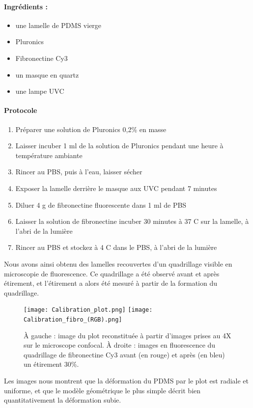 	\paragraph{Ingrédients : }
	\begin{itemize}
	\item une lamelle de PDMS vierge
	\item Pluronics
	\item Fibronectine Cy3
	\item un masque en quartz 
	\item une lampe UVC
	\end{itemize}
	
	\paragraph{Protocole}
	\begin{enumerate}
	\item Préparer une solution de Pluronics 0,2\% en masse
	\item Laisser incuber 1 ml de la solution de Pluronics pendant une heure à température ambiante
	\item Rincer au PBS, puis à l'eau, laisser sécher
	\item Exposer la lamelle derrière le masque aux UVC pendant 7 minutes
	\item Diluer 4 \micro g de fibronectine fluorescente dans 1 ml de PBS
	\item Laisser la solution de fibronectine incuber 30 minutes à 37 \degres C sur la lamelle, à l'abri de la lumière
	\item Rincer au PBS et stockez à 4 \degres C dans le PBS, à l'abri de la lumière
\end{enumerate}		
	
	Nous avons ainsi obtenu des lamelles recouvertes d'un quadrillage visible en microscopie de fluorescence. Ce quadrillage a été observé avant et après étirement, et l'étirement a alors été mesuré à partir de la formation du quadrillage.
	
	\begin{figure}
	\texttt{[image: Calibration\_plot.png]}
	\texttt{[image: Calibration\_fibro\_(RGB).png]}
	\caption{À gauche : image du plot reconstituée à partir d'images prises au 4X sur le microscope confocal. À droite : images en fluorescence du quadrillage de fibronectine Cy3 avant (en rouge) et après (en bleu) un étirement 30\%.}
	\end{figure}
	
	Les images nous montrent que la déformation du PDMS par le plot est radiale et uniforme, et que le modèle géométrique le plus simple décrit bien quantitativement la déformation subie. 
	
